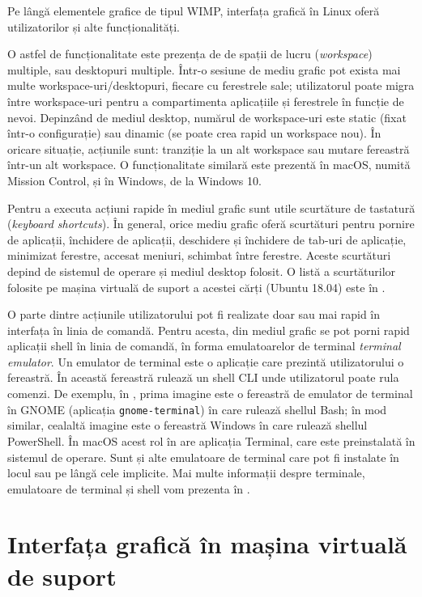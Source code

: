 Pe lângă elementele grafice de tipul WIMP, interfața grafică în Linux oferă utilizatorilor și alte funcționalități.

O astfel de funcționalitate este prezența de de spații de lucru (\textit{workspace}) multiple, sau desktopuri multiple. Într-o sesiune de mediu grafic pot exista mai multe workspace-uri/desktopuri, fiecare cu ferestrele sale; utilizatorul poate migra între workspace-uri pentru a compartimenta aplicațiile și ferestrele în funcție de nevoi. Depinzând de mediul desktop, numărul de workspace-uri este static (fixat într-o configurație) sau dinamic (se poate crea rapid un workspace nou). În oricare situație, acțiunile sunt: tranziție la un alt workspace sau mutare fereastră într-un alt workspace. O funcționalitate similară este prezentă în macOS, numită Mission Control, și în Windows, de la Windows 10.

Pentru a executa acțiuni rapide în mediul grafic sunt utile scurtăture de tastatură (\textit{keyboard shortcuts}). În general, orice mediu grafic oferă scurtături pentru pornire de aplicații, închidere de aplicații, deschidere și închidere de tab-uri de aplicație, minimizat ferestre, accesat meniuri, schimbat între ferestre. Aceste scurtături depind de sistemul de operare și mediul desktop folosit. O listă a scurtăturilor folosite pe mașina virtuală de suport a acestei cărți (Ubuntu 18.04) este în .

O parte dintre acțiunile utilizatorului pot fi realizate doar sau mai rapid în interfața în linia de comandă. Pentru acesta, din mediul grafic se pot porni rapid aplicații shell în linia de comandă, în forma emulatoarelor de terminal \textit{terminal emulator}. Un emulator de terminal este o aplicație care prezintă utilizatorului o fereastră. În această fereastră rulează un shell CLI unde utilizatorul poate rula comenzi. De exemplu, în , prima imagine este o fereastră de emulator de terminal în GNOME (aplicația \texttt{gnome-terminal}) în care rulează shellul Bash; în mod similar, cealaltă imagine este o fereastră Windows în care rulează shellul PowerShell. În macOS acest rol în are aplicația Terminal, care este preinstalată în sistemul de operare. Sunt și alte emulatoare de terminal care pot fi instalate în locul sau pe lângă cele implicite. Mai multe informații despre terminale, emulatoare de terminal și shell vom prezenta în .

\section{Interfața grafică în mașina virtuală de suport}
\label{sec:ui:vm}

